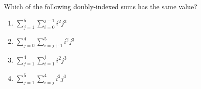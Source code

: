 \documentclass{article}
\begin{document}
\begin{enumerate}
\begin{center}
                \end{center}
                
                 Which of the following doubly-indexed sums has the same value?
                 
                 \begin{enumerate}
                     \item $\displaystyle \sum_{j=1}^{5}\sum_{i=0}^{j-1} i^2j^3$
                     \item $\displaystyle \sum_{j=0}^{4}\sum_{i=j+1}^{5} i^2j^3$
                     \item $\displaystyle \sum_{j=1}^{4}\sum_{i=1}^{j} i^2j^3$
                     \item $\displaystyle \sum_{j=1}^{5}\sum_{i=j}^{4} i^2j^3$
                 \end{enumerate}
                    

\end{enumerate}
\end{document}
